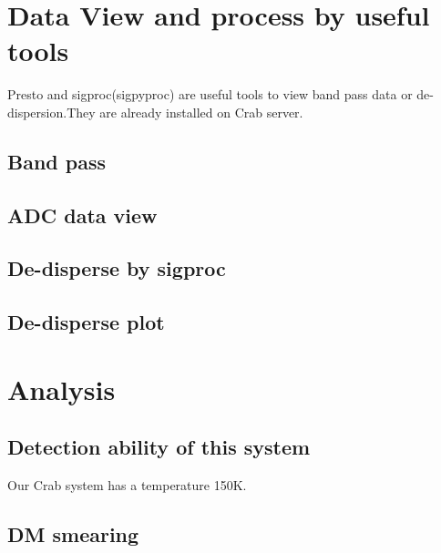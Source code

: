 \documentclass{article}
\begin{document}
\section{Data View and process by useful tools}
Presto and sigproc(sigpyproc) are useful tools to view band pass data or de-dispersion.They are already installed on Crab server.
\subsection{Band pass}

\subsection{ADC data view}
\subsection{De-disperse by sigproc}
\subsection{De-disperse plot}
\section{Analysis}
\subsection{Detection ability of this system}
Our Crab system has a temperature 150K.
\subsection{DM smearing}
\end{document}
